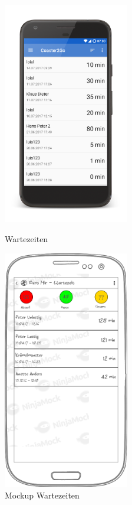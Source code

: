 \begin{figure}[H]
    \centering
    \begin{minipage}{0.49\textwidth}
        \centering
        \includegraphics[width=0.49\textwidth, trim=150 200 200 200, 
        clip]{img/screenshots/ss_wartezeiten.png}
        \caption{Wartezeiten}
		\label{figure:implementierungwartezeiten}
    \end{minipage}
    \begin{minipage}{0.49\textwidth}
        \centering
        \includegraphics[width=0.49\textwidth]{img/mockups/m_wartezeiten.png}
        \caption{Mockup Wartezeiten}
    \end{minipage}
\end{figure}

